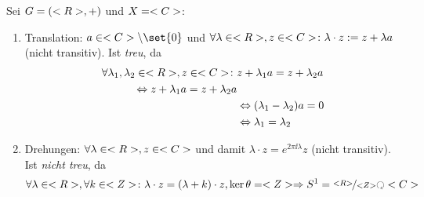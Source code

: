 \begin{*example}
	Sei $G=(<R>,+)$ und $X = <C>$:
	\begin{enumerate} %
		\item Translation: $a \in \C\setminus \set{0}$ und $\forall \lambda \in <R>, z \in <C>\colon \lambda \cdot z := z + \lambda a$ (nicht transitiv). Ist \emph{treu}, da
		\begin{align*}
			\forall \lambda_1, \lambda_2 \in <R>, z \in <C>\colon &z + \lambda_1 a = z + \lambda_2 a\\
			\Leftrightarrow z + \lambda_1 a = z + \lambda_2 a\\
			&\Leftrightarrow (\lambda_1-\lambda_2)a = 0\\
			&\Leftrightarrow \lambda_1 = \lambda_2
		\end{align*}
		\item Drehungen: $\forall \lambda \in <R>, z \in <C>$ und damit $\lambda \cdot z = e^{2\pi\ii \lambda}z$ (nicht transitiv). Ist \emph{nicht treu}, da 
		\begin{align*}
			\forall \lambda \in \R, \forall k \in \Z\colon \lambda \cdot z = (\lambda + k) \cdot z,	\ker\theta = \Z \implies S^1 = \lnkset{\R}{\Z} \Circlearrowleft \C
		\end{align*}
	\end{enumerate}
\end{*example}
